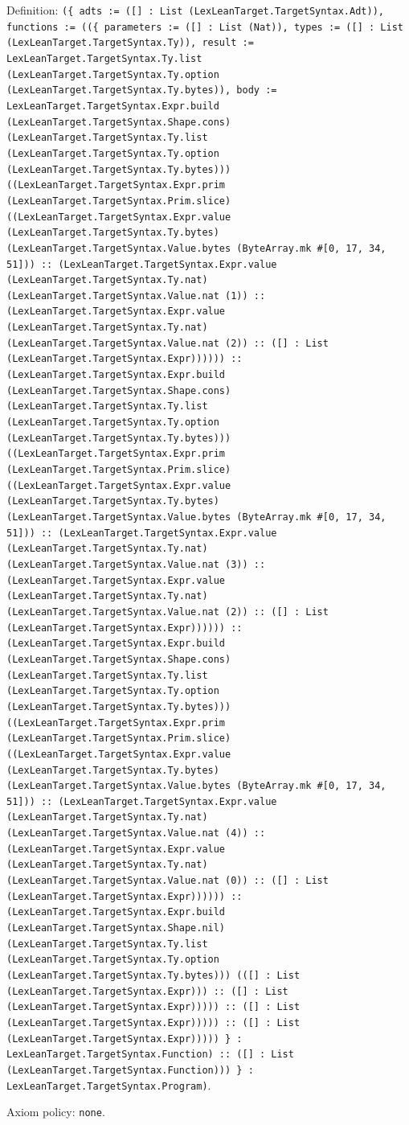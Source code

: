 \documentclass[11pt]{article}
\begin{document}
\noindent Definition: \texttt{(\{ adts := ([] : List (LexLeanTarget.TargetSyntax.Adt)), functions := ((\{ parameters := ([] : List (Nat)), types := ([] : List (LexLeanTarget.TargetSyntax.Ty)), result := LexLeanTarget.TargetSyntax.Ty.list (LexLeanTarget.TargetSyntax.Ty.option (LexLeanTarget.TargetSyntax.Ty.bytes)), body := LexLeanTarget.TargetSyntax.Expr.build (LexLeanTarget.TargetSyntax.Shape.cons) (LexLeanTarget.TargetSyntax.Ty.list (LexLeanTarget.TargetSyntax.Ty.option (LexLeanTarget.TargetSyntax.Ty.bytes))) ((LexLeanTarget.TargetSyntax.Expr.prim (LexLeanTarget.TargetSyntax.Prim.slice) ((LexLeanTarget.TargetSyntax.Expr.value (LexLeanTarget.TargetSyntax.Ty.bytes) (LexLeanTarget.TargetSyntax.Value.bytes (ByteArray.mk \#[0, 17, 34, 51])) :: (LexLeanTarget.TargetSyntax.Expr.value (LexLeanTarget.TargetSyntax.Ty.nat) (LexLeanTarget.TargetSyntax.Value.nat (1)) :: (LexLeanTarget.TargetSyntax.Expr.value (LexLeanTarget.TargetSyntax.Ty.nat) (LexLeanTarget.TargetSyntax.Value.nat (2)) :: ([] : List (LexLeanTarget.TargetSyntax.Expr)))))) :: (LexLeanTarget.TargetSyntax.Expr.build (LexLeanTarget.TargetSyntax.Shape.cons) (LexLeanTarget.TargetSyntax.Ty.list (LexLeanTarget.TargetSyntax.Ty.option (LexLeanTarget.TargetSyntax.Ty.bytes))) ((LexLeanTarget.TargetSyntax.Expr.prim (LexLeanTarget.TargetSyntax.Prim.slice) ((LexLeanTarget.TargetSyntax.Expr.value (LexLeanTarget.TargetSyntax.Ty.bytes) (LexLeanTarget.TargetSyntax.Value.bytes (ByteArray.mk \#[0, 17, 34, 51])) :: (LexLeanTarget.TargetSyntax.Expr.value (LexLeanTarget.TargetSyntax.Ty.nat) (LexLeanTarget.TargetSyntax.Value.nat (3)) :: (LexLeanTarget.TargetSyntax.Expr.value (LexLeanTarget.TargetSyntax.Ty.nat) (LexLeanTarget.TargetSyntax.Value.nat (2)) :: ([] : List (LexLeanTarget.TargetSyntax.Expr)))))) :: (LexLeanTarget.TargetSyntax.Expr.build (LexLeanTarget.TargetSyntax.Shape.cons) (LexLeanTarget.TargetSyntax.Ty.list (LexLeanTarget.TargetSyntax.Ty.option (LexLeanTarget.TargetSyntax.Ty.bytes))) ((LexLeanTarget.TargetSyntax.Expr.prim (LexLeanTarget.TargetSyntax.Prim.slice) ((LexLeanTarget.TargetSyntax.Expr.value (LexLeanTarget.TargetSyntax.Ty.bytes) (LexLeanTarget.TargetSyntax.Value.bytes (ByteArray.mk \#[0, 17, 34, 51])) :: (LexLeanTarget.TargetSyntax.Expr.value (LexLeanTarget.TargetSyntax.Ty.nat) (LexLeanTarget.TargetSyntax.Value.nat (4)) :: (LexLeanTarget.TargetSyntax.Expr.value (LexLeanTarget.TargetSyntax.Ty.nat) (LexLeanTarget.TargetSyntax.Value.nat (0)) :: ([] : List (LexLeanTarget.TargetSyntax.Expr)))))) :: (LexLeanTarget.TargetSyntax.Expr.build (LexLeanTarget.TargetSyntax.Shape.nil) (LexLeanTarget.TargetSyntax.Ty.list (LexLeanTarget.TargetSyntax.Ty.option (LexLeanTarget.TargetSyntax.Ty.bytes))) (([] : List (LexLeanTarget.TargetSyntax.Expr))) :: ([] : List (LexLeanTarget.TargetSyntax.Expr))))) :: ([] : List (LexLeanTarget.TargetSyntax.Expr))))) :: ([] : List (LexLeanTarget.TargetSyntax.Expr))))) \} : LexLeanTarget.TargetSyntax.Function) :: ([] : List (LexLeanTarget.TargetSyntax.Function))) \} : LexLeanTarget.TargetSyntax.Program)}.\par
\noindent Axiom policy: \texttt{none}.\par
\end{document}
